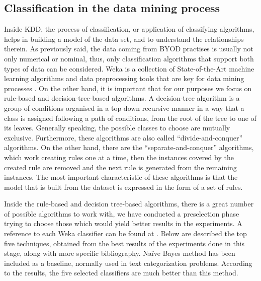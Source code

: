 \subsection{Classification in the data mining process}

Inside KDD, the process of classification, or application of classifying algorithms, helps in building a model of the data set, and to understand the relationships therein. As previously said, the data coming from BYOD practises is usually not only numerical or nominal, thus, only classification algorithms that support both types of data can be considered. Weka \cite{weka:site} is a collection of State-of-the-Art machine learning algorithms and data preprocessing tools that are key for data mining processes \cite{witten2016data}. On the other hand, it is important that for our purposes we focus on rule-based and decision-tree-based algorithms. A decision-tree algorithm is a group of conditions organised in a top-down recursive manner in a way that a class is assigned following a path of conditions, from the root of the tree to one of its leaves. Generally speaking, the possible classes to choose are mutually exclusive. Furthermore, these algorithms are also called ``divide-and-conquer'' algorithms. On the other hand, there are the ``separate-and-conquer'' algorithms, which work creating rules one at a time, then the instances covered by the created rule are removed and the next rule is generated from the remaining instances. The most important characteristic of these algorithms is that the model that is built from the dataset is expressed in the form of a set of rules.

Inside the rule-based and decision tree-based algorithms, there is a great number of possible algorithms to work with, we have conducted a preselection phase trying to choose those which would yield better results in the experiments. A reference to each Weka classifier can be found at \cite{witten2016data}. Below are described the top five techniques, obtained from the best results  of the experiments done in this stage, along with more specific bibliography. Na\"{i}ve Bayes method \cite{Bayesian_Classifier_97} has been included as a baseline, normally used in text categorization problems. According to the results, the five selected classifiers are much better than this method.


